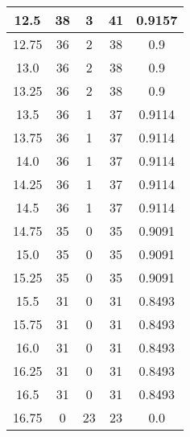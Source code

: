 \documentclass[letterpaper, 12pt]{article}
\begin{document}
\begin{longtable}{|c|c|c|c|c|}
12.5 & 38 & 3 & 41 & 0.9157 \\
\hline
12.75 & 36 & 2 & 38 & 0.9 \\
\hline
13.0 & 36 & 2 & 38 & 0.9 \\
\hline
13.25 & 36 & 2 & 38 & 0.9 \\
\hline
13.5 & 36 & 1 & 37 & 0.9114 \\
\hline
13.75 & 36 & 1 & 37 & 0.9114 \\
\hline
14.0 & 36 & 1 & 37 & 0.9114 \\
\hline
14.25 & 36 & 1 & 37 & 0.9114 \\
\hline
14.5 & 36 & 1 & 37 & 0.9114 \\
\hline
14.75 & 35 & 0 & 35 & 0.9091 \\
\hline
15.0 & 35 & 0 & 35 & 0.9091 \\
\hline
15.25 & 35 & 0 & 35 & 0.9091 \\
\hline
15.5 & 31 & 0 & 31 & 0.8493 \\
\hline
15.75 & 31 & 0 & 31 & 0.8493 \\
\hline
16.0 & 31 & 0 & 31 & 0.8493 \\
\hline
16.25 & 31 & 0 & 31 & 0.8493 \\
\hline
16.5 & 31 & 0 & 31 & 0.8493 \\
\hline
16.75 & 0 & 23 & 23 & 0.0 \\
\hline
\end{longtable}
\end{document}
